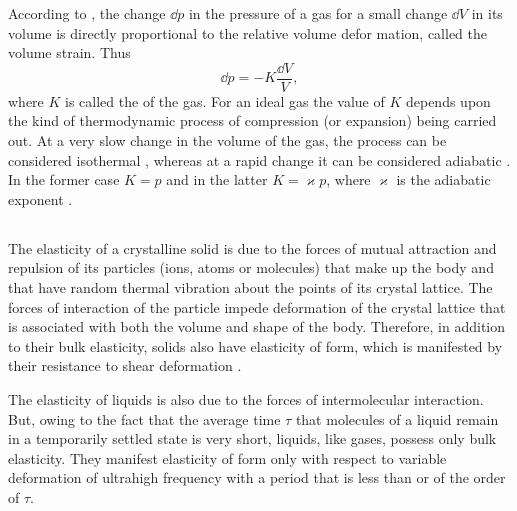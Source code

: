 According to , the change
$\dd p$ in the pressure of a gas for a small change $\dd V$ in its
volume is directly proportional to the relative volume defor­ mation,
called the volume strain. Thus
\begin{equation*}%
\dd p = -K \frac{\dd V}{V},
\end{equation*}
where $K$ is called the  of the gas. For an ideal gas  the value of $K$ depends upon the kind of thermodynamic process of compression (or expansion) being carried out. At a very slow change in the volume of the gas, the process can be considered isothermal , whereas at a rapid change it can be considered adiabatic . In the former case $K= p$ and in the latter $K = \varkappa p$, where $\varkappa$ is the adiabatic exponent .

\subsection{}\label{30.1.2} The elasticity of a crystalline solid is due to the forces of mutual attraction and repulsion of its particles (ions, atoms or molecules) that make up the body and that have random thermal vibration about the points of its crystal lattice. The forces of interaction of the particle impede deformation of the crystal lattice that is associated with both the volume and shape of the body. Therefore, in addition to their bulk elasticity, solids also have elasticity of form, which is manifested by their resistance to shear deformation .

The elasticity of liquids is also due to the forces of intermolecular interaction. But, owing to the fact that the average time $\tau$ that molecules of a liquid remain in a temporarily settled state  is very short, liquids, like gases, possess only bulk elasticity. They manifest elasticity of form only with respect to variable deformation of ultrahigh frequency with a period that is less than or of the order of $\tau$.

